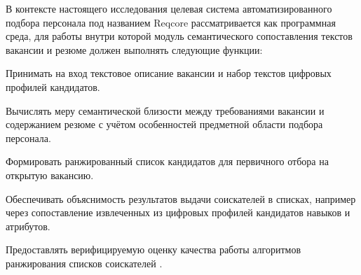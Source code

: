 В контексте настоящего исследования целевая система автоматизированного подбора персонала под названием Reqcore рассматривается как программная среда, для работы внутри которой модуль семантического сопоставления текстов вакансии и резюме должен выполнять следующие функции:\par
\begin{compactenum}
  \item Принимать на вход текстовое описание вакансии и набор текстов цифровых профилей кандидатов.
  \item Вычислять меру семантической близости между требованиями вакансии и содержанием резюме с учётом особенностей предметной области подбора персонала.
  \item Формировать ранжированный список кандидатов для первичного отбора на открытую вакансию.
  \item Обеспечивать объяснимость результатов выдачи соискателей в списках, например через сопоставление извлеченных из цифровых профилей кандидатов навыков и атрибутов.
  \item Предоставлять верифицируемую оценку качества работы алгоритмов ранжирования списков соискателей \cite{src02, src23}.
\end{compactenum}
